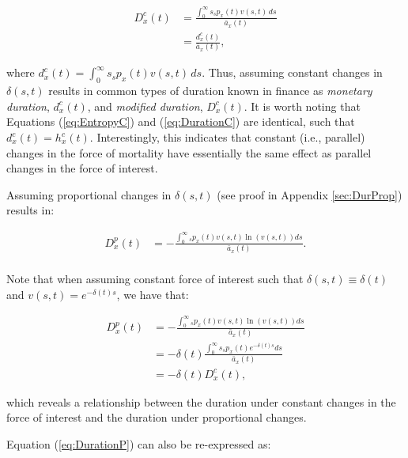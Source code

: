 \documentclass[12pt]{article}
\begin{document}
\begin{equation}\label{eq:DurationC}
	\begin{split}
		{D}^{c}_x(t) &= \frac{\int_0^\infty s {}_s p_x(t) {v}(s,t) \, ds}{\bar{a}_x(t)} \\
		&= \frac{{d}^{c}_x(t)}{\bar{a}_x(t)},
	\end{split}
\end{equation}

where ${d}^{c}_x(t) = \int_0^\infty s {}_s p_x(t) {v}(s,t) \, ds$. Thus, assuming constant changes in $\delta(s,t)$ results in common types of duration known in finance as \textit{monetary duration}, ${d}^{c}_x(t)$, and \textit{modified duration}, ${D}^{c}_x(t)$. It is worth noting that Equations (\ref{eq:EntropyC}) and (\ref{eq:DurationC}) are identical, such that ${d}^{c}_x(t) = {h}^{c}_{x}(t)$. Interestingly, this indicates that constant (i.e., parallel) changes in the force of mortality have essentially the same effect as parallel changes in the force of interest.

Assuming proportional changes in $\delta(s,t)$ (see proof in Appendix \ref{sec:DurProp}) results in: 


\begin{equation}\label{eq:DurationP}
\begin{split}
{D}^{p}_{x}(t) &= -\frac{\int_0^\infty {}_sp_x(t) v(s,t) \ln(v(s,t))ds}{\bar{a}_x(t)}. \\
\end{split}
\end{equation}

\color{blue}
Note that when assuming constant force of interest such that $\delta(s,t) \equiv \delta(t)$ and $v(s,t)=e^{-\delta(t)s}$, we have that:


\begin{equation}\label{eq:DurationCP}
\begin{split}
{D}^{p}_{x}(t) &= -\frac{\int_0^\infty {}_sp_x(t) v(s,t) \ln(v(s,t))ds}  {\bar{a}_x(t)} \\
&=- \delta(t)\frac{\int_0^\infty s{}_sp_x(t) e^{-\delta(t)s}  ds}{\bar{a}_x(t)} \\
& =- \delta(t){D}^{c}_{x}(t),
\end{split}
\end{equation}


which reveals a relationship between the duration under constant changes in the force of interest and the duration under proportional changes.
\color{black}

Equation (\ref{eq:DurationP}) can also be re-expressed as:
\end{document}
